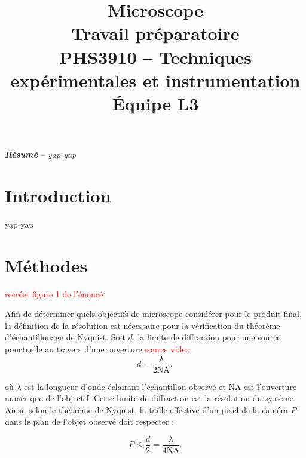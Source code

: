 \documentclass[conference]{IEEEtran}
\begin{document}
\title{Microscope\\
\large Travail préparatoire \\
PHS3910 -- Techniques expérimentales et instrumentation\\ 
Équipe L3}

\author{
\and
{}
\and
{}
\and
{}
}

\maketitle

\textit{\textbf{Résumé} -- yap yap}

\section{Introduction}

yap yap

\section{Méthodes \label{methodes}}

\textcolor{red}{recréer figure 1 de l'énoncé}

Afin de déterminer quels objectifs de microscope considérer pour le produit final, la définition
de la résolution est nécessaire pour la vérification du théorème d'échantillonage de Nyquist. Soit $d$,
la limite de diffraction pour une source ponctuelle au travers d'une ouverture \textcolor{red}{source video}:
\begin{equation}
  d = \frac{\lambda}{2 \text{NA}},
\end{equation}

où $\lambda$ est la longueur d'onde éclairant l'échantillon observé et NA est l'ouverture numérique de
l'objectif. Cette limite de diffraction est la résolution du système. Ainsi, selon le théorème
de Nyquist, la taille effective d'un pixel de la caméra $P$ dans le plan de l'objet observé doit respecter :

\begin{equation}\label{nyquist}
  P \leq \frac{d}{2} = \frac{\lambda}{4 \text{NA} }.
\end{equation}
\end{document}

